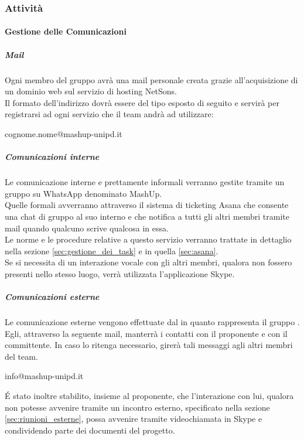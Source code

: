 		\subsubsection{Attività}
			\paragraph{Gestione delle Comunicazioni}
					\subparagraph{Mail}
					\label{sec:mail}
					Ogni membro del gruppo avrà una mail personale creata grazie all'acquisizione di un dominio web sul servizio di hosting NetSons. \\
					Il formato dell'indirizzo dovrà essere del tipo esposto di seguito e servirà per registrarsi ad ogni servizio che il team andrà ad utilizzare:
						\begin{center}
							cognome.nome@mashup-unipd.it
						\end{center}
												
				\subparagraph{Comunicazioni interne}
				\label{sec:comunicazioni_interne}
				Le comunicazione interne e prettamente informali verranno gestite tramite un gruppo su WhatsApp denominato MashUp. \\
				Quelle formali avverranno attraverso il sistema di ticketing\gloss{} Asana\gloss{} che consente una chat di gruppo al suo interno e che notifica a tutti gli altri membri tramite mail quando qualcuno scrive qualcosa in essa. \\
				Le norme e le procedure relative a questo servizio verranno trattate in dettaglio nella sezione \ref{sec:gestione_dei_task} e in quella \ref{sec:asana}. \\
				Se si necessita di un interazione vocale con gli altri membri, qualora non fossero presenti nello stesso luogo, verrà utilizzata l'applicazione Skype.
				\subparagraph{Comunicazioni esterne}
				\label{sec:comunicazioni_esterne}
				Le comunicazione esterne vengono effettuate dal \roleProjectManager{} in quanto rappresenta il gruppo \groupName. \\
				Egli, attraverso la seguente mail, manterrà i contatti con il proponente\gloss{} e con il committente\gloss{}. In caso lo ritenga necessario, girerà tali messaggi agli altri membri del team.
					\begin{center}
						info@mashup-unipd.it
					\end{center}
					\'E stato inoltre stabilito, insieme al proponente, che l'interazione con lui, qualora non potesse avvenire tramite un incontro esterno, specificato nella sezione \ref{sec:riunioni_esterne}, possa avvenire tramite videochiamata in Skype	e condividendo parte dei documenti del progetto.	
